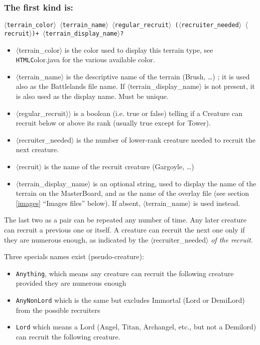 \documentclass{article}
\begin{document}
\subsubsection*{The first kind is:}

\texttt{$\langle$terrain\_color$\rangle$ $\langle$terrain\_name$\rangle$ $\langle$regular\_recruit$\rangle$ ($\langle$recruiter\_needed$\rangle$ $\langle$recruit$\rangle$)+ $\langle$terrain\_display\_name$\rangle$?}

\begin{itemize}
\item $\langle$terrain\_color$\rangle$ is the color used to display this terrain type, see \texttt{HTMLC}olor.java for the various available color.
\item $\langle$terrain\_name$\rangle$ is the descriptive name of the terrain (Brush, \ldots) ; it is used also as the Battlelands file name. If $\langle$terrain\_display\_name$\rangle$ is not present, it is also used as the display name. Must be unique.
\item $\langle$regular\_recruit$\rangle$$\rangle$ is a boolean (i.e. true or false) telling if a Creature can recruit below or above its rank (usually true except for Tower).
\item $\langle$recruiter\_needed$\rangle$ is the number of lower-rank creature needed to recruit the next creature.
\item $\langle$recruit$\rangle$ is the name of the recruit creature (Gargoyle, \ldots)
\item $\langle$terrain\_display\_name$\rangle$ is an optional string, used to display the name of the terrain on the MasterBoard, and as the name of the overlay file (see section \ref{images} ``Images files'' below). If absent, $\langle$terrain\_name$\rangle$ is used instead.
\end{itemize}

The last two as a pair can be repeated any number of time. Any later creature can recruit a previous one or itself. A creature can recruit the next one only if they are numerous enough, as indicated by the $\langle$recruiter\_needed$\rangle$ \emph{of the recruit}.

Three specials names exist (pseudo-creature):
\begin{itemize}
\item \texttt{Anything}, which means any creature can recruit the following creature provided they are numerous enough
\item \texttt{AnyNonLord} which is the same but excludes Immortal (Lord or DemiLord) from the possible recruiters
\item \texttt{Lord} which means a Lord (Angel, Titan, Archangel, etc., but not a Demilord) can recruit the following creature.
\end{itemize}
\end{document}
